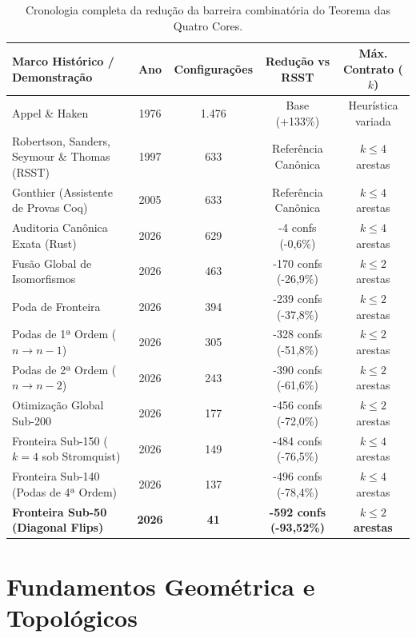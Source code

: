 \documentclass[10pt,a4paper]{article}
\begin{document}
\begin{table}[h!]
\centering
\small
\begin{tabular}{lcccc}
\toprule
\textbf{Marco Histórico / Demonstração} & \textbf{Ano} & \textbf{Configurações} & \textbf{Redução vs RSST} & \textbf{Máx. Contrato ($k$)} \\
\midrule
Appel \& Haken & 1976 & 1.476 & Base (+133\%) & Heurística variada \\
Robertson, Sanders, Seymour \& Thomas (RSST) & 1997 & 633 & Referência Canônica & $k \le 4$ arestas \\
Gonthier (Assistente de Provas Coq) & 2005 & 633 & Referência Canônica & $k \le 4$ arestas \\
Auditoria Canônica Exata (Rust) & 2026 & 629 & -4 confs (-0,6\%) & $k \le 4$ arestas \\
Fusão Global de Isomorfismos & 2026 & 463 & -170 confs (-26,9\%) & $k \le 2$ arestas \\
Poda de Fronteira & 2026 & 394 & -239 confs (-37,8\%) & $k \le 2$ arestas \\
Podas de 1ª Ordem ($n \to n-1$) & 2026 & 305 & -328 confs (-51,8\%) & $k \le 2$ arestas \\
Podas de 2ª Ordem ($n \to n-2$) & 2026 & 243 & -390 confs (-61,6\%) & $k \le 2$ arestas \\
Otimização Global Sub-200 & 2026 & 177 & -456 confs (-72,0\%) & $k \le 2$ arestas \\
Fronteira Sub-150 ($k=4$ sob Stromquist) & 2026 & 149 & -484 confs (-76,5\%) & $k \le 4$ arestas \\
Fronteira Sub-140 (Podas de 4ª Ordem) & 2026 & 137 & -496 confs (-78,4\%) & $k \le 4$ arestas \\
\midrule
\rowcolor{cardbg}
\textbf{Fronteira Sub-50 (Diagonal Flips)} & \textbf{2026} & \textbf{41} & \textbf{-592 confs (-93,52\%)} & \textbf{$k \le 2$ arestas} \\
\bottomrule
\end{tabular}
\caption{Cronologia completa da redução da barreira combinatória do Teorema das Quatro Cores.}
\end{table}

\section{Fundamentos Geométrica e Topológicos}
\end{document}
